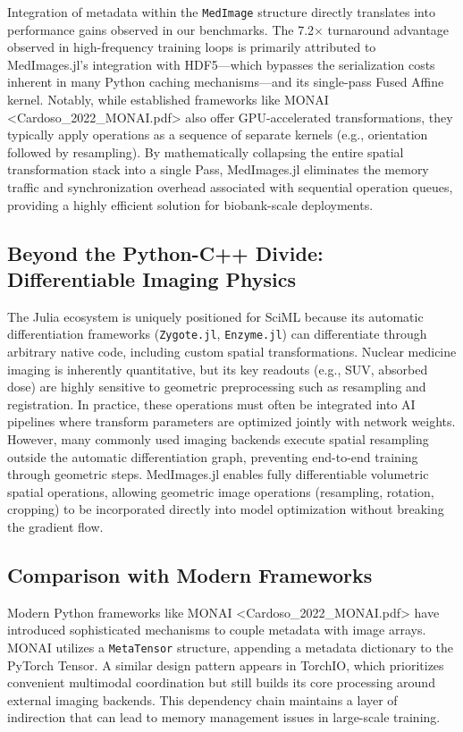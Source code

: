 \documentclass[10pt,letterpaper]{article}
\begin{document}
Integration of metadata within the \texttt{MedImage} structure directly translates into performance gains observed in our benchmarks. The 7.2$\times$ turnaround advantage observed in high-frequency training loops is primarily attributed to MedImages.jl's integration with HDF5—which bypasses the serialization costs inherent in many Python caching mechanisms—and its single-pass Fused Affine kernel. Notably, while established frameworks like MONAI <Cardoso_2022_MONAI.pdf> also offer GPU-accelerated transformations, they typically apply operations as a sequence of separate kernels (e.g., orientation followed by resampling). By mathematically collapsing the entire spatial transformation stack into a single Pass, MedImages.jl eliminates the memory traffic and synchronization overhead associated with sequential operation queues, providing a highly efficient solution for biobank-scale deployments.

\subsection*{Beyond the Python-C++ Divide: Differentiable Imaging Physics}
The Julia ecosystem is uniquely positioned for SciML because its automatic differentiation frameworks (\texttt{Zygote.jl}, \texttt{Enzyme.jl}) can differentiate through arbitrary native code, including custom spatial transformations. Nuclear medicine imaging is inherently quantitative, but its key readouts (e.g., SUV, absorbed dose) are highly sensitive to geometric preprocessing such as resampling and registration. In practice, these operations must often be integrated into AI pipelines where transform parameters are optimized jointly with network weights. However, many commonly used imaging backends execute spatial resampling outside the automatic differentiation graph, preventing end-to-end training through geometric steps. MedImages.jl enables fully differentiable volumetric spatial operations, allowing geometric image operations (resampling, rotation, cropping) to be incorporated directly into model optimization without breaking the gradient flow.

\subsection*{Comparison with Modern Frameworks}
Modern Python frameworks like MONAI <Cardoso_2022_MONAI.pdf> have introduced sophisticated mechanisms to couple metadata with image arrays. MONAI utilizes a \texttt{MetaTensor} structure, appending a metadata dictionary to the PyTorch Tensor. A similar design pattern appears in TorchIO, which prioritizes convenient multimodal coordination but still builds its core processing around external imaging backends. This dependency chain maintains a layer of indirection that can lead to memory management issues in large-scale training.
\end{document}

